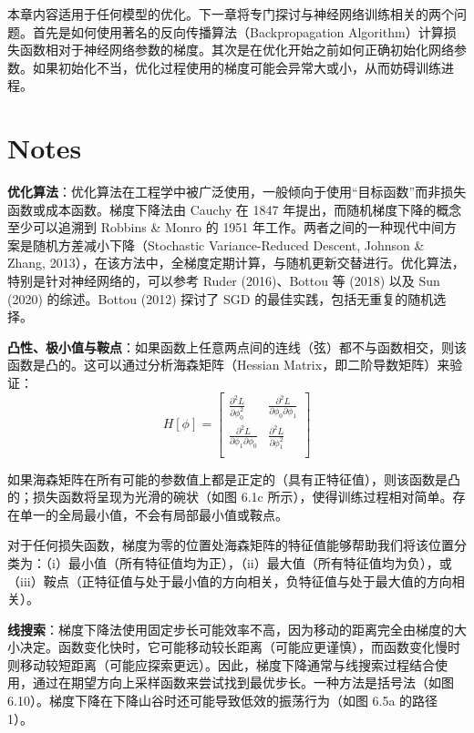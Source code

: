 本章内容适用于任何模型的优化。下一章将专门探讨与神经网络训练相关的两个问题。首先是如何使用著名的反向传播算法（Backpropagation Algorithm）计算损失函数相对于神经网络参数的梯度。其次是在优化开始之前如何正确初始化网络参数。如果初始化不当，优化过程使用的梯度可能会异常大或小，从而妨碍训练进程。
\section{Notes}
\textbf{优化算法}：优化算法在工程学中被广泛使用，一般倾向于使用“目标函数”而非损失函数或成本函数。梯度下降法由 Cauchy 在 1847 年提出，而随机梯度下降的概念至少可以追溯到 Robbins \& Monro 的 1951 年工作。两者之间的一种现代中间方案是随机方差减小下降（Stochastic Variance-Reduced Descent, Johnson \& Zhang, 2013），在该方法中，全梯度定期计算，与随机更新交替进行。优化算法，特别是针对神经网络的，可以参考 Ruder (2016)、Bottou 等 (2018) 以及 Sun (2020) 的综述。Bottou (2012) 探讨了 SGD 的最佳实践，包括无重复的随机选择。

\textbf{凸性、极小值与鞍点}：如果函数上任意两点间的连线（弦）都不与函数相交，则该函数是凸的。这可以通过分析海森矩阵（Hessian Matrix，即二阶导数矩阵）来验证：
\begin{equation}
H[\phi] = \begin{bmatrix}
	\frac{\partial^2 L}{\partial \phi_0^2} & \frac{\partial^2 L}{\partial \phi_0 \partial \phi_1}  \\
	\frac{\partial^2 L}{\partial \phi_1 \partial \phi_0} & \frac{\partial^2 L}{\partial \phi_1^2}  \\
\end{bmatrix} 
\end{equation}

如果海森矩阵在所有可能的参数值上都是正定的（具有正特征值），则该函数是凸的；损失函数将呈现为光滑的碗状（如图 6.1c 所示），使得训练过程相对简单。存在单一的全局最小值，不会有局部最小值或鞍点。

对于任何损失函数，梯度为零的位置处海森矩阵的特征值能够帮助我们将该位置分类为：（i）最小值（所有特征值均为正），（ii）最大值（所有特征值均为负），或（iii）鞍点（正特征值与处于最小值的方向相关，负特征值与处于最大值的方向相关）。

\textbf{线搜索}：梯度下降法使用固定步长可能效率不高，因为移动的距离完全由梯度的大小决定。函数变化快时，它可能移动较长距离（可能应更谨慎），而函数变化慢时则移动较短距离（可能应探索更远）。因此，梯度下降通常与线搜索过程结合使用，通过在期望方向上采样函数来尝试找到最优步长。一种方法是括号法（如图 6.10）。梯度下降在下降山谷时还可能导致低效的振荡行为（如图 6.5a 的路径 1）。

